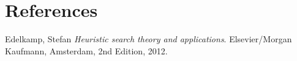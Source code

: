 \chapter{References}
\begin{thebibliography}{9}

  Edelkamp, Stefan
  \emph{Heuristic search theory and applications}.
  Elsevier/Morgan Kaufmann, Amsterdam,
  2nd Edition,
  2012.

\end{thebibliography}

